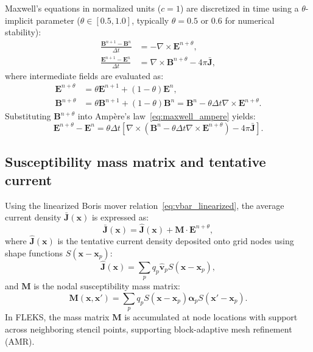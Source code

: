 \documentclass[a4paper, 11pt]{article}
\begin{document}
Maxwell's equations in normalized units ($c=1$) are discretized in time using a $\theta$-implicit parameter ($\theta \in [0.5, 1.0]$, typically $\theta = 0.5$ or $0.6$ for numerical stability):
\begin{align}
\frac{\mathbf{B}^{n+1} - \mathbf{B}^n}{\Delta t} &= -\nabla \times \mathbf{E}^{n+\theta}, \label{eq:maxwell_faraday} \\
\frac{\mathbf{E}^{n+1} - \mathbf{E}^n}{\Delta t} &= \nabla \times \mathbf{B}^{n+\theta} - 4\pi \bar{\mathbf{J}}, \label{eq:maxwell_ampere}
\end{align}
where intermediate fields are evaluated as:
\begin{align}
\mathbf{E}^{n+\theta} &= \theta \mathbf{E}^{n+1} + (1-\theta)\mathbf{E}^n, \\
\mathbf{B}^{n+\theta} &= \theta \mathbf{B}^{n+1} + (1-\theta)\mathbf{B}^n = \mathbf{B}^n - \theta \Delta t \nabla \times \mathbf{E}^{n+\theta}.
\end{align}
Substituting $\mathbf{B}^{n+\theta}$ into Amp\`ere's law~\eqref{eq:maxwell_ampere} yields:
\begin{equation}
\mathbf{E}^{n+\theta} - \mathbf{E}^n = \theta \Delta t \left[ \nabla \times \left(\mathbf{B}^n - \theta \Delta t \nabla \times \mathbf{E}^{n+\theta}\right) - 4\pi \bar{\mathbf{J}} \right].
\label{eq:ampere_intermediate}
\end{equation}

\subsection{Susceptibility mass matrix and tentative current}

Using the linearized Boris mover relation~\eqref{eq:vbar_linearized}, the average current density $\bar{\mathbf{J}}(\mathbf{x})$ is expressed as:
\begin{equation}
\bar{\mathbf{J}}(\mathbf{x}) = \hat{\mathbf{J}}(\mathbf{x}) + \mathbf{M} \cdot \mathbf{E}^{n+\theta},
\end{equation}
where $\hat{\mathbf{J}}(\mathbf{x})$ is the tentative current density deposited onto grid nodes using shape functions $S(\mathbf{x} - \mathbf{x}_p)$:
\begin{equation}
\hat{\mathbf{J}}(\mathbf{x}) = \sum_p q_p \hat{\mathbf{v}}_p S(\mathbf{x} - \mathbf{x}_p),
\end{equation}
and $\mathbf{M}$ is the nodal susceptibility mass matrix:
\begin{equation}
\mathbf{M}(\mathbf{x}, \mathbf{x}') = \sum_p q_p S(\mathbf{x} - \mathbf{x}_p) \boldsymbol{\alpha}_p S(\mathbf{x}' - \mathbf{x}_p).
\end{equation}
In FLEKS, the mass matrix $\mathbf{M}$ is accumulated at node locations with support across neighboring stencil points, supporting block-adaptive mesh refinement (AMR).
\end{document}
